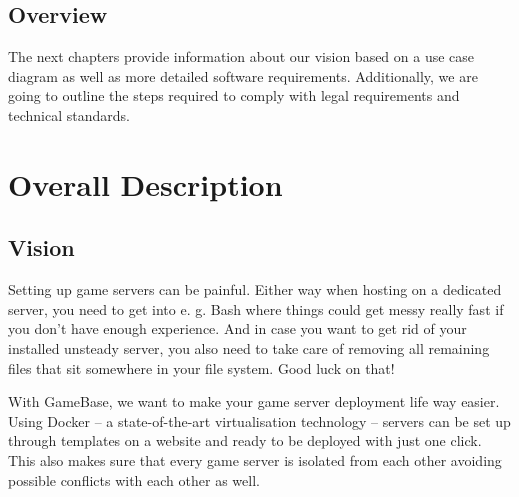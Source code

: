 \documentclass[a4paper,12pt,chapterprefix=false,bibliography=totoc,listof=totoc,]{scrreprt}
\begin{document}
\section{Overview}
The next chapters provide information about our vision based on a use case diagram as well as more detailed software requirements. Additionally, we are going to outline the steps required to comply with legal requirements and technical standards.

\chapter{Overall Description}
\section{Vision}
Setting up game servers can be painful. Either way when hosting on a dedicated server, you need to get into e. g. Bash where things could get messy really fast if you don't have enough experience. And in case you want to get rid of your installed unsteady server, you also need to take care of removing all remaining files that sit somewhere in your file system. Good luck on that!

With GameBase, we want to make your game server deployment life way easier. Using Docker – a state-of-the-art virtualisation technology – servers can be set up through templates on a website and ready to be deployed with just one click. This also makes sure that every game server is isolated from each other avoiding possible conflicts with each other as well.
\end{document}
